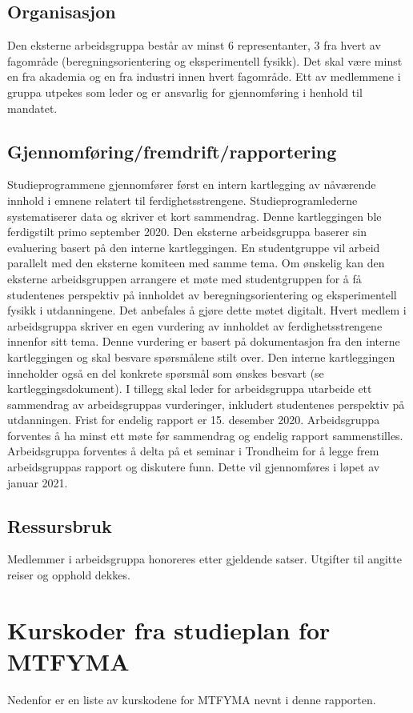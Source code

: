 \documentclass{article}
\begin{document}
\subsection{Organisasjon}
Den eksterne arbeidsgruppa består av minst 6 representanter, 3 fra hvert av fagområde (beregningsorientering og eksperimentell fysikk). Det skal være minst en fra akademia og en fra industri innen hvert fagområde.
Ett av medlemmene i gruppa utpekes som leder og er ansvarlig for gjennomføring i henhold til mandatet.

\subsection{Gjennomføring/fremdrift/rapportering}
Studieprogrammene gjennomfører først en intern kartlegging av nåværende innhold i emnene relatert til ferdighetsstrengene. Studieprogramlederne systematiserer data og skriver et kort sammendrag. Denne kartleggingen ble ferdigstilt primo september 2020.
Den eksterne arbeidsgruppa baserer sin evaluering basert på den interne kartleggingen. En studentgruppe vil arbeid parallelt med den eksterne komiteen med samme tema. Om ønskelig kan den eksterne arbeidsgruppen arrangere et møte med studentgruppen for å få studentenes perspektiv på innholdet av beregningsorientering og eksperimentell fysikk i utdanningene. Det anbefales å gjøre dette møtet digitalt.
Hvert medlem i arbeidsgruppa skriver en egen vurdering av innholdet av ferdighetsstrengene innenfor sitt tema. Denne vurdering er basert på dokumentasjon fra den interne kartleggingen og skal besvare spørsmålene stilt over. Den interne kartleggingen inneholder også en del konkrete spørsmål som ønskes besvart (se kartleggingsdokument).
I tillegg skal leder for arbeidsgruppa utarbeide ett sammendrag av arbeidsgruppas vurderinger, inkludert studentenes perspektiv på utdanningen.
Frist for endelig rapport er 15. desember 2020.
Arbeidsgruppa forventes å ha minst ett møte før sammendrag og endelig rapport sammenstilles.
Arbeidsgruppa forventes å delta på et seminar i Trondheim for å legge frem arbeidsgruppas rapport og diskutere funn. Dette vil gjennomføres i løpet av januar 2021.

\subsection{Ressursbruk}
Medlemmer i arbeidsgruppa honoreres etter gjeldende satser.
Utgifter til angitte reiser og opphold dekkes.


\section{Kurskoder fra studieplan for MTFYMA}
Nedenfor er en liste av kurskodene for MTFYMA nevnt i denne rapporten.
\end{document}
